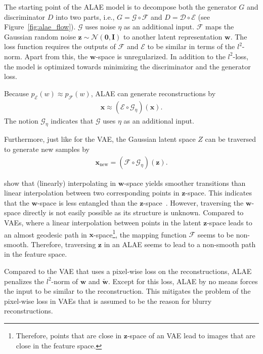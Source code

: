 The starting point of the \ac{ALAE} model is to decompose both the generator $G$ and discriminator $D$ into two parts, i.e., $G=\mathcal{G}\circ \mathcal{F}$ and $D=\mathcal{D}\circ \mathcal{E}$ (see Figure~\ref{fig:alae_flow}).
$\mathcal{G}$ uses noise $\eta$ as an additional input.
$\mathcal{F}$ maps the Gaussian random noise $\bm{z} \sim \mathcal{N}(\bm{0}, \bm{I})$ to another latent representation $\bm{w}$.
The loss function requires the outputs of $\mathcal{F}$ and $\mathcal{E}$ to be similar in terms of the $l^2$-norm.
Apart from this, the $\bm{w}$-space is unregularized.
In addition to the $l^2$-loss, the model is optimized towards minimizing the discriminator and the generator loss.

Because $p_{\mathcal{E}}(w) \approx p_{\mathcal{F}}(w)$, \ac{ALAE} can generate reconstructions by
\begin{align}
    \bm{x}\approx (\mathcal{E}\circ \mathcal{G}_\eta)(\bm{x}).
\end{align}
The notion $\mathcal{G}_\eta$ indicates that $\mathcal{G}$ uses $\eta$ as an additional input.

Furthermore, just like for the \ac{VAE}, the Gaussian latent space $Z$ can be traversed to generate new samples by
\begin{align}
    \bm{x}_{\text{new}} = (\mathcal{F}\circ \mathcal{G}_\eta)(\bm{z}).
\end{align}

\citet{pidhorskyi2020adversarial} show that (linearly) interpolating in $\bm{w}$-space yields smoother transitions than linear interpolation between two corresponding points in $\bm{z}$-space.
This indicates that the $\bm{w}$-space is less entangled than the $\bm{z}$-space~\citep{shao2018riemannian,arvanitidis2017latent}.
However, traversing the $\bm{w}$-space directly is not easily possible as its structure is unknown.
Compared to \acp{VAE}, where a linear interpolation between points in the latent $\bm{z}$-space leads to an almost geodesic path in $\bm{x}$-space\footnote{Therefore, points that are close in $\bm{z}$-space of an \ac{VAE} lead to images that are close in the feature space.}, the mapping function $\mathcal{F}$ seems to be non-smooth.
Therefore, traversing $\bm{z}$ in an \ac{ALAE} seems to lead to a non-smooth path in the feature space.

Compared to the \ac{VAE} that uses a pixel-wise loss on the reconstructions, \ac{ALAE} penalizes the $l^2$-norm of $\bm{w}$ and $\tilde{\bm{w}}$.
Except for this loss, \ac{ALAE} by no means forces the input to be similar to the reconstruction.
This mitigates the problem of the pixel-wise loss in \acp{VAE} that is assumed to be the reason for blurry reconstructions.

